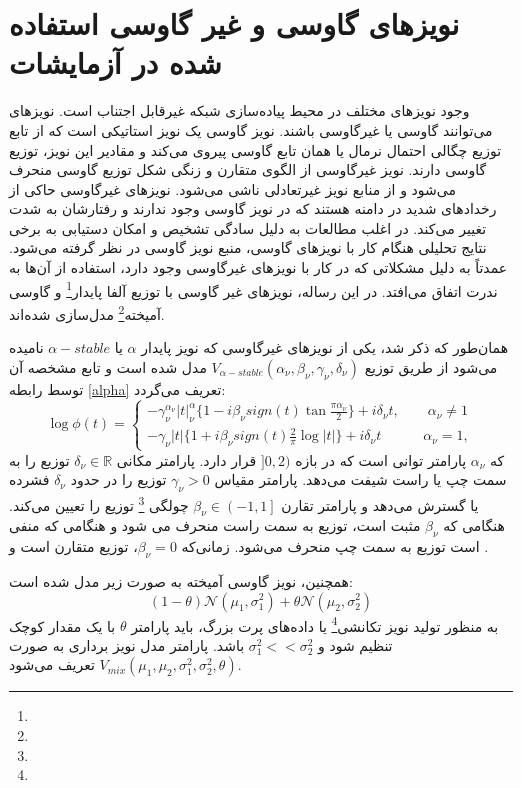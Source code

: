\section{نویزهای گاوسی و غیر گاوسی استفاده شده در آزمایشات}
وجود نویزهای مختلف در محیط پیاده‌سازی شبکه غیرقابل اجتناب است. نویزهای می‌توانند گاوسی یا غیرگاوسی باشند. ‌‌نویز گاوسی یک نویز استاتیکی است که از تابع توزیع چگالی احتمال نرمال یا همان تابع گاوسی پیروی می‌کند و مقادیر این نویز، توزیع گاوسی دارند. نویز غیرگاوسی از الگوی متقارن و زنگی شکل توزیع گاوسی منحرف می‌شود و از منابع نویز غیرتعادلی ناشی می‌شود. نویزهای غیرگاوسی حاکی از رخدادهای شدید در دامنه هستند که در نویز گاوسی وجود ندارند و رفتارشان به شدت تغییر می‌کند. در اغلب مطالعات به دلیل سادگی تشخیص و امکان دستیابی به برخی نتایج تحلیلی هنگام کار با نویزهای گاوسی، منبع نویز گاوسی در نظر گرفته می‌شود. عمدتاً به دلیل مشکلاتی که در کار با نویزهای غیرگاوسی وجود دارد، استفاده از آن‌ها به ندرت اتفاق می‌افتد. در این رساله، نویزهای غیر گاوسی با توزیع آلفا پایدار\footnote{} و گاوسی آمیخته\footnote{} مدل‌سازی شده‌اند.

همان‌طور که ذکر شد، یکی از نویزهای غیرگاوسی که نویز پایدار $\alpha$ یا $\alpha-stable$ نامیده می‌شود از طریق توزیع $V_{\alpha-stable}(\alpha_{\nu},\beta_\nu,\gamma_{\nu},\delta_\nu)$ \cite{alphastable} مدل شده است و تابع مشخصه آن توسط رابطه \ref{alpha} تعریف می‌گردد:
\begin{equation}\label{alpha}
	\log \phi(t)=
	\begin{cases}
		-\gamma_{\nu}^{\alpha_{\nu}}|t|^\alpha_\nu\{1-i\beta_\nu sign(t)\tan\frac{\pi\alpha_\nu}{2}\}+i\delta_\nu t,\qquad\alpha_\nu\ne1\\
		-\gamma_\nu|t|\{1+i\beta_\nu sign(t)\frac{2}{\pi}\log|t|\}+i\delta_\nu t   \quad\qquad \alpha_\nu=1,
	\end{cases}
\end{equation}
که $\alpha_{\nu}$ پارامتر توانی است که در بازه $]0,2)$ قرار دارد. پارامتر مکانی $\delta_\nu\in \mathbb{R}$ توزیع را به سمت چپ یا راست شیفت می‌دهد. پارامتر مقیاس $\gamma_{\nu}>0$ توزیع را در حدود $\delta_\nu$ فشرده یا گسترش می‌دهد و پارامتر تقارن $\beta_\nu\in \left(-1,1\right]$ چولگی \footnote{} توزیع را تعیین می‌کند. هنگامی که $\beta_\nu$ مثبت است، توزیع به سمت راست منحرف می شود و هنگامی که منفی است توزیع به سمت چپ منحرف می‌شود. زمانی‌که $\beta_\nu=0$، توزیع متقارن است \cite{alphastable_1999} و \cite{alphastable}.

همچنین، نویز گاوسی آمیخته به صورت زیر مدل شده است:
\begin{equation}
	(1-\theta)\mathcal{N}(\mu_1,\sigma_1^2)+\theta\mathcal{N}(\mu_2,\sigma_2^2)
\end{equation}
به منظور تولید نویز تکانشی\footnote{} یا داده‌های پرت بزرگ، باید پارامتر $\theta$ با یک مقدار کوچک تنظیم شود و $\sigma_1^2<<\sigma_2^2$ باشد. پارامتر مدل نویز برداری به صورت $V_{mix}(\mu_1,\mu_2,\sigma_1^2,\sigma_2^2,\theta)$ تعریف می‌شود. 
